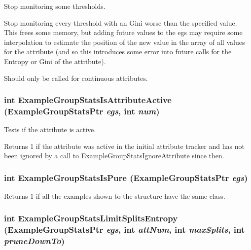 Stop monitoring some thresholds. 

Stop monitoring every threshold with an Gini worse than the specified value. This frees some memory, but adding future values to the egs may require some interpolation to estimate the position of the new value in the array of all values for the attribute (and so this introduces some error into future calls for the Entropy or Gini of the attribute).

Should only be called for continuous attributes. 
\subsubsection{\setlength{\rightskip}{0pt plus 5cm}int Example\-Group\-Stats\-Is\-Attribute\-Active ({\bf Example\-Group\-Stats\-Ptr} {\em egs}, int {\em num})}\label{ExampleGroupStats_8h_a28}


Tests if the attribute is active. 

Returns 1 if the attribute was active in the initial attribute tracker and has not been ignored by a call to Example\-Group\-Stats\-Ignore\-Attribute since then. 
\subsubsection{\setlength{\rightskip}{0pt plus 5cm}int Example\-Group\-Stats\-Is\-Pure ({\bf Example\-Group\-Stats\-Ptr} {\em egs})}\label{ExampleGroupStats_8h_a34}


Returns 1 if all the examples shown to the structure have the same class. 

\subsubsection{\setlength{\rightskip}{0pt plus 5cm}int Example\-Group\-Stats\-Limit\-Splits\-Entropy ({\bf Example\-Group\-Stats\-Ptr} {\em egs}, int {\em att\-Num}, int {\em max\-Splits}, int {\em prune\-Down\-To})}\label{ExampleGroupStats_8h_a52}


